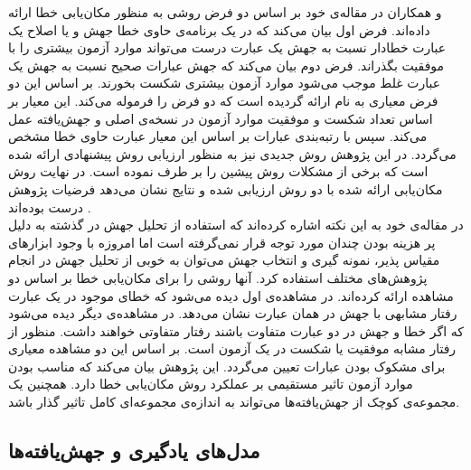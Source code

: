  و همکاران در مقاله‌ی خود بر اساس دو فرض روشی به منظور مکان‌یابی خطا ارائه داده‌اند. فرض اول بیان می‌کند که  در یک برنامه‌ی حاوی خطا جهش و یا اصلاح یک عبارت خطا‌دار نسبت به جهش یک عبارت درست می‌تواند موارد آزمون بیشتری را  با موفقیت بگذراند. فرض دوم  بیان می‌کند که جهش عبارات صحیح نسبت به جهش یک عبارت غلط موجب می‌شود موارد آزمون بیشتری شکست بخورند. بر اساس این دو فرض معیاری به نام   ارائه گردیده است که دو فرض را فرموله می‌کند. این معیار بر اساس تعداد شکست و موفقیت موارد آزمون در نسخه‌ی اصلی و جهش‌یافته عمل می‌کند. سپس با رتبه‌بندی عبارات بر اساس این معیار عبارت حاوی خطا مشخص می‌گردد. در این پژوهش روش جدیدی نیز به منظور ارزیابی روش پیشنهادی ارائه شده است که برخی از مشکلات روش پیشین را بر طرف نموده است. در نهایت روش مکان‌یابی ارائه شده با دو روش ارزیابی شده و نتایج نشان می‌دهد فرضیات پژوهش درست بوده‌اند \cite{moon2014ask}. \\

 در مقاله‌ی خود به این نکته اشاره کرده‌اند  که استفاده از تحلیل جهش در گذشته به دلیل پر هزینه بودن چندان مورد توجه قرار نمی‌گرفته است اما امروزه با وجود ابزارهای مقیاس پذیر، نمونه گیری و انتخاب جهش می‌توان به خوبی از تحلیل جهش در انجام پژوهش‌های مختلف استفاده کرد\cite{papadakis2015metallaxis}. آنها روشی را برای مکان‌یابی خطا بر اساس دو مشاهده ارائه کرده‌اند. در مشاهده‌ی اول دیده می‌شود که خطای موجود در یک عبارت رفتار مشابهی با جهش در همان عبارت نشان می‌دهد. در مشاهده‌ی دیگر دیده می‌شود که اگر  خطا و جهش در دو عبارت متفاوت باشند رفتار متفاوتی خواهند داشت. منظور از رفتار مشابه موفقیت یا شکست در یک آزمون است. بر اساس این دو مشاهده معیاری برای مشکوک بودن عبارات تعیین می‌گردد. این پژوهش بیان می‌کند که مناسب بودن موارد آزمون تاثیر مستقیمی بر عملکرد روش مکان‌یابی خطا  دارد. همچنین یک مجموعه‌ی کوچک از جهش‌یافته‌ها می‌تواند به اندازه‌ی مجموعه‌ای کامل تاثیر گذار باشد. \\

\subsection{مدل‌های یادگیری و جهش‌یافته‌ها}
 
